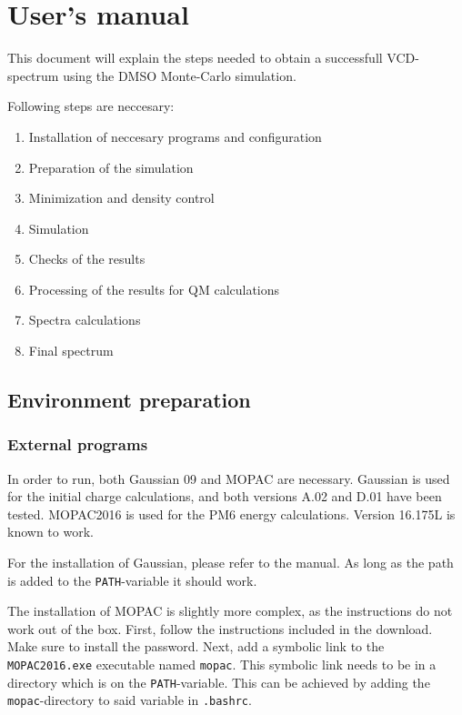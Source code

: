 \documentclass[a4paper,fleqn]{report}
\begin{document}
	
	\chapter{User's manual}

	
	This document will explain the steps needed to obtain a successfull VCD-spectrum using the DMSO Monte-Carlo simulation.
	
	Following steps are neccesary:
	\begin{enumerate}
		\setlength{\itemsep}{-1pt}
		\setlength{\parsep}{-1pt}
		\item Installation of neccesary programs and configuration
		\item Preparation of the simulation
		\item Minimization and density control
		\item Simulation
		\item Checks of the results
		\item Processing of the results for QM calculations
		\item Spectra calculations
		\item Final spectrum
	\end{enumerate}
	
	\section{Environment preparation}
	
	\subsection{External programs}
	In order to run, both Gaussian 09\cite{g09} and MOPAC\cite{mopac} are 
	necessary. Gaussian is used 
	for the initial charge calculations, and both versions A.02 and D.01 have 
	been tested.
	MOPAC2016 is used for the PM6 energy calculations. Version 16.175L is known 
	to work.
	
	For the installation of Gaussian, please refer to the manual. As long as 
	the path is added to the \verb|PATH|-variable it should work.
	
	The installation of MOPAC is slightly more complex, as the instructions do 
	not work out of the box.
	First, follow the instructions included in the download. Make sure to 
	install the password.
	Next, add a symbolic link to the \verb|MOPAC2016.exe| executable named 
	\verb|mopac|.
	This symbolic link needs to be in a directory which is on the 
	\verb|PATH|-variable. This can be achieved by adding the 
	\verb|mopac|-directory to said variable in \verb|.bashrc|.
	
\end{document}
